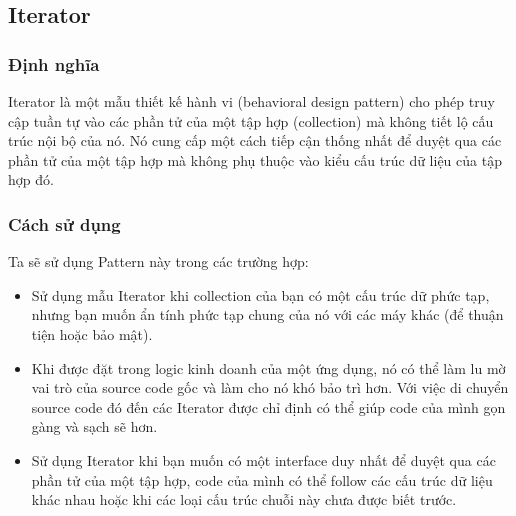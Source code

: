 \subsection{Iterator}
\subsubsection{Định nghĩa}
Iterator là một mẫu thiết kế hành vi (behavioral design pattern) cho phép truy cập tuần tự vào các phần tử của một tập hợp (collection) mà không tiết lộ cấu trúc nội bộ của nó. Nó cung cấp một cách tiếp cận thống nhất để duyệt qua các phần tử của một tập hợp mà không phụ thuộc vào kiểu cấu trúc dữ liệu của tập hợp đó.
\subsubsection{Cách sử dụng}
Ta sẽ sử dụng Pattern này trong các trường hợp:
\begin{itemize}
    \item Sử dụng mẫu Iterator khi collection của bạn có một cấu trúc dữ phức tạp, nhưng bạn muốn ẩn tính phức tạp chung của nó với các máy khác (để thuận tiện hoặc bảo mật).
    \item Khi được đặt trong logic kinh doanh của một ứng dụng, nó có thể làm lu mờ vai trò của source code gốc và làm cho nó khó bảo trì hơn. Với việc di chuyển source code đó đến các Iterator được chỉ định có thể giúp code của mình gọn gàng và sạch sẽ hơn.
    \item Sử dụng Iterator khi bạn muốn có một interface duy nhất để duyệt qua các phần tử của một tập hợp, code của mình có thể follow các cấu trúc dữ liệu khác nhau hoặc khi các loại cấu trúc chuỗi này chưa được biết trước.
\end{itemize}
